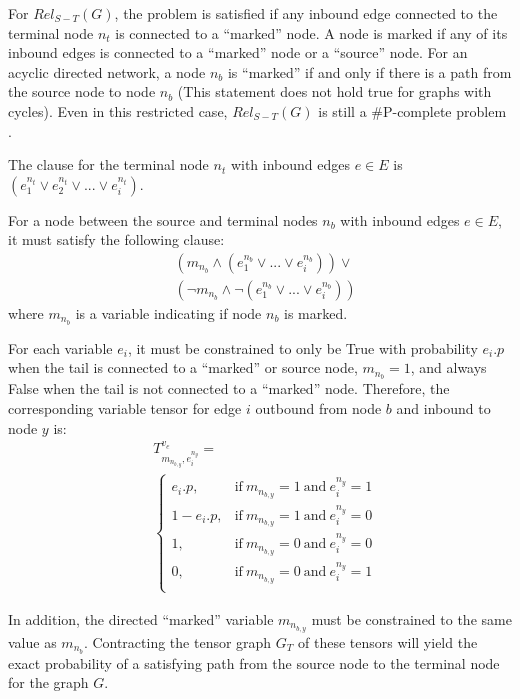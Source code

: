 \documentclass[12pt,twocolumn]{article}
\begin{document}
For \(Rel_{S-T}(G)\), the problem is satisfied if any inbound edge connected to the terminal node \(n_t\) is connected to a ``marked'' node. A node is marked if any of its inbound edges is connected to a ``marked'' node or a ``source'' node. For an acyclic directed network, a node \(n_b\) is ``marked'' if and only if there is a path from the source node to node \(n_b\) (This statement does not hold true for graphs with cycles). Even in this restricted case, \(Rel_{S-T}(G)\) is still a \#P-complete problem \cite{provan1986complexity}.

The clause for the terminal node \(n_t\) with inbound edges \(e \in E\) is \((e_1^{n_t} \lor e_2^{n_t} \lor ... \lor e_i^{n_t})\).

For a node between the source and terminal nodes \(n_b\) with inbound edges \(e \in E\), it must satisfy the following clause: \begin{equation*}
\begin{split}
& (m_{n_b} \land (e_1^{n_b} \lor ... \lor e_i^{n_b})) \lor \\
& (\neg m_{n_b} \land \neg (e_1^{n_b} \lor ... \lor e_i^{n_b}))
\end{split}
\end{equation*} where \(m_{n_b}\) is a variable indicating if node \(n_b\) is marked.

For each variable \(e_i\), it must be constrained to only be True with probability \(e_i.p\) when the tail is connected to a ``marked'' or source node, \(m_{n_b}=1\), and always False when the tail is not connected to a ``marked'' node. Therefore, the corresponding variable tensor for edge \(i\) outbound from node \(b\) and inbound to node \(y\) is: \begin{equation*}
\begin{split}
& T^{v_e}_{m_{n_{b,y}},e_i^{n_y}}= \\
& \begin{cases}
  e_i.p, & \text{if}\ m_{n_{b,y}}=1\ \text{and}\ e_i^{n_y}=1 \\
  1-e_i.p, & \text{if}\ m_{n_{b,y}}=1\ \text{and}\ e_i^{n_y}=0 \\
  1, & \text{if}\ m_{n_{b,y}}=0\ \text{and}\ e_i^{n_y}=0 \\
  0, & \text{if}\ m_{n_{b,y}}=0\ \text{and}\ e_i^{n_y}=1 \\
\end{cases}
\end{split}
\end{equation*}

In addition, the directed ``marked'' variable \(m_{n_{b,y}}\) must be constrained to the same value as \(m_{n_b}\). Contracting the tensor graph \(G_T\) of these tensors will yield the exact probability of a satisfying path from the source node to the terminal node for the graph \(G\).
\end{document}
